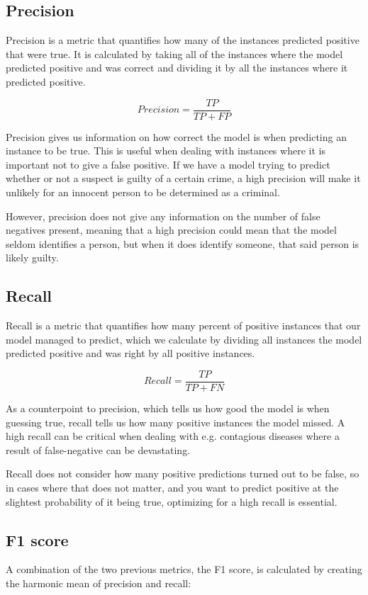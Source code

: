 \documentclass[nofilelist]{cslthse-msc}
\begin{document}
\subsection{Precision}
Precision is a metric that quantifies how many of the instances predicted positive that were true. It is calculated by taking all of the instances where the model predicted positive and was correct and dividing it by all the instances where it predicted positive.

$$ Precision = \frac{TP}{TP + FP}$$

Precision gives us information on how correct the model is when predicting an instance to be true. This is useful when dealing with instances where it is important not to give a false positive. If we have a model trying to predict whether or not a suspect is guilty of a certain crime, a high precision will make it unlikely for an innocent person to be determined as a criminal. 

However, precision does not give any information on the number of false negatives present, meaning that a high precision could mean that the model seldom identifies a person, but when it does identify someone, that said person is likely guilty.

\subsection{Recall}
Recall is a metric that quantifies how many percent of positive instances that our model managed to predict, which we calculate by dividing all instances the model predicted positive and was right by all positive instances.

$$ Recall =\frac{TP}{TP + FN}$$

As a counterpoint to precision, which tells us how good the model is when guessing true, recall tells us how many positive instances the model missed. A high recall can be critical when dealing with e.g. contagious diseases where a result of false-negative can be devastating. 

Recall does not consider how many positive predictions turned out to be false, so in cases where that does not matter, and you want to predict positive at the slightest probability of it being true, optimizing for a high recall is essential.


\subsection{F1 score}
A combination of the two previous metrics, the F1 score, is calculated by creating the harmonic mean of precision and recall:
\end{document}
